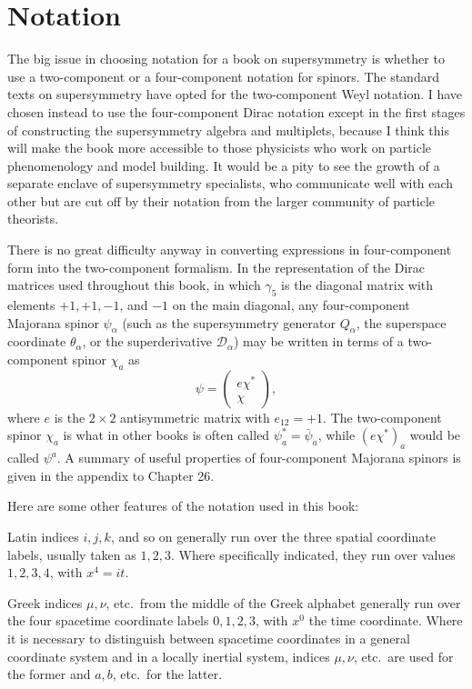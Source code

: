 \section*{Notation}


The big issue in choosing notation for a book on supersymmetry is whether to
use a two-component or a four-component notation for spinors. The standard
texts on supersymmetry have opted for the two-component Weyl notation. I have
chosen instead to use the four-component Dirac notation except in the first
stages of constructing the supersymmetry algebra and multiplets, because I
think this will make the book more accessible to those physicists who work on
particle phenomenology and model building. It would be a pity to see the
growth of a separate enclave of supersymmetry specialists, who communicate
well with each other but are cut off by their notation from the larger
community of particle theorists.

There is no great difficulty anyway in converting expressions in
four-component form into the two-component formalism. In the representation
of the Dirac matrices used throughout this book, in which \(\gamma_5\) is the
diagonal matrix with elements \(+1,+1,-1\), and \(-1\) on the main diagonal,
any four-component Majorana spinor \(\psi_\alpha\) (such as the supersymmetry
generator \(Q_\alpha\), the superspace coordinate \(\theta_\alpha\), or the
superderivative \(\mathcal{D}_\alpha\)) may be written in terms of a
two-component spinor \(\chi_a\) as
\[
  \psi=
  \begin{pmatrix}
    e\chi^*\\
    \chi
  \end{pmatrix},
\]
where \(e\) is the \(2\times2\) antisymmetric matrix with \(e_{12}=+1\). The
two-component spinor \(\chi_a\) is what in other books is often called
\(\psi_a^*=\bar{\psi}_{\dot a}\), while \((e\chi^*)_a\) would be called
\(\psi^a\). A summary of useful properties of four-component Majorana spinors
is given in the appendix to Chapter 26.

Here are some other features of the notation used in this book:

Latin indices \(i,j,k\), and so on generally run over the three spatial
coordinate labels, usually taken as \(1,2,3\). Where specifically indicated,
they run over values \(1,2,3,4\), with \(x^4=it\).

Greek indices \(\mu,\nu\), etc.\ from the middle of the Greek alphabet
generally run over the four spacetime coordinate labels \(0,1,2,3\), with
\(x^0\) the time coordinate. Where it is necessary to distinguish between
spacetime coordinates in a general coordinate system and in a locally inertial
system, indices \(\mu,\nu\), etc.\ are used for the former and \(a,b\), etc.\
for the latter.

